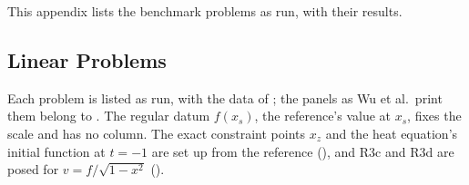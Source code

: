 %

This appendix lists the benchmark problems as run, with their results.

\subsection{Linear Problems}
\label{app:catalogue-linear}

Each problem is listed as run, with the data of ; the panels as Wu et al.\ print them belong to . The regular datum $f(x_s)$, the reference's value at $x_s$, fixes the scale and has no column. The exact constraint points $x_z$ and the heat equation's initial function at $t=-1$ are set up from the reference (), and R3c and R3d are posed for $v=f/\sqrt{1-x^2}$ ().

